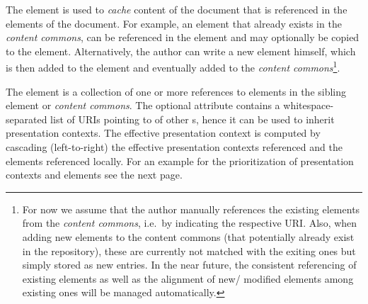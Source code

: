 \documentclass[pdftex,bibtotocnumbered,idxtotoc,11pt]{scrartcl}
\begin{document}
The {} element is used to {\emph{cache}} content of the document that is
referenced in the {} elements of the document. For example, an
{} element that already exists in the {\emph{content commons}}, can be
referenced in the {} element and may optionally be copied to the
{} element. Alternatively, the author can write a new {}
element himself, which is then added to the {} element and eventually
added to the {\emph{content commons}}\footnote{For now we assume that the author manually
  references the existing elements from the \textit{content commons}, i.e.\ by indicating
  the respective URI. Also, when adding new elements to the content commons (that
  potentially already exist in the repository), these are currently not matched with the
  exiting ones but simply stored as new entries. In the near future, the consistent
  referencing of existing elements as well as the alignment of new/ modified elements
  among existing ones will be managed automatically.}.

The {} element is a collection of one or more references to
{} elements in the sibling {} element or
{\emph{content commons}}. The optional {} attribute contains a
whitespace-separated list of URIs pointing to {} of other {\narcon}s,
hence it can be used to inherit presentation contexts. The effective presentation context
is computed by cascading (left-to-right) the effective presentation contexts referenced
and the {} elements referenced locally. For an example for the
prioritization of presentation contexts and elements see the next page.


\end{document}
